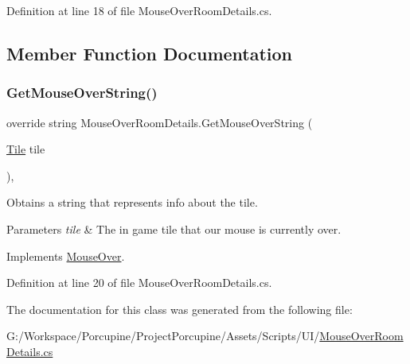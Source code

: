 Definition at line 18 of file Mouse\+Over\+Room\+Details.\+cs.



\subsection{Member Function Documentation}
\mbox{\label{class_mouse_over_room_details_aaac2329038d3c038cbf60d82b89b6bd0}} 
\subsubsection{\texorpdfstring{Get\+Mouse\+Over\+String()}{GetMouseOverString()}}
{\footnotesize\ttfamily override string Mouse\+Over\+Room\+Details.\+Get\+Mouse\+Over\+String (\begin{DoxyParamCaption}\item[{\hyperlink{class_tile}{Tile}}]{tile }\end{DoxyParamCaption})\hspace{0.3cm}{\ttfamily [protected]}, {\ttfamily [virtual]}}



Obtains a string that represents info about the tile. 


\begin{DoxyParams}{Parameters}
{\em tile} & The in game tile that our mouse is currently over.\\
\hline
\end{DoxyParams}


Implements \hyperlink{class_mouse_over_a9878f4e4b19afa1056f4386aa0e67452}{Mouse\+Over}.



Definition at line 20 of file Mouse\+Over\+Room\+Details.\+cs.



The documentation for this class was generated from the following file\+:\begin{DoxyCompactItemize}
\item 
G\+:/\+Workspace/\+Porcupine/\+Project\+Porcupine/\+Assets/\+Scripts/\+U\+I/\hyperlink{_mouse_over_room_details_8cs}{Mouse\+Over\+Room\+Details.\+cs}\end{DoxyCompactItemize}
